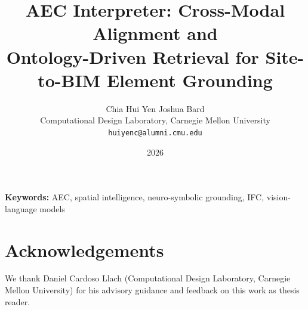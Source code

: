 \documentclass[11pt]{article}
\title{\bfseries AEC Interpreter: Cross-Modal Alignment and\\
Ontology-Driven Retrieval for Site-to-BIM Element Grounding}
\author{Chia Hui Yen \qquad Joshua Bard\\
\small Computational Design Laboratory, Carnegie Mellon University\\
\small \texttt{huiyenc@alumni.cmu.edu}}
\date{2026}
\begin{document}
\maketitle

\begin{abstract}

\end{abstract}

\noindent\textbf{Keywords:} AEC, spatial intelligence, neuro-symbolic grounding, IFC, vision-language models

\FloatBarrier
\FloatBarrier
\FloatBarrier
\FloatBarrier
\FloatBarrier

\section*{Acknowledgements}
We thank Daniel Cardoso Llach (Computational Design Laboratory, Carnegie Mellon University) for his
advisory guidance and feedback on this work as thesis reader.




\clearpage
\appendix

\end{document}

